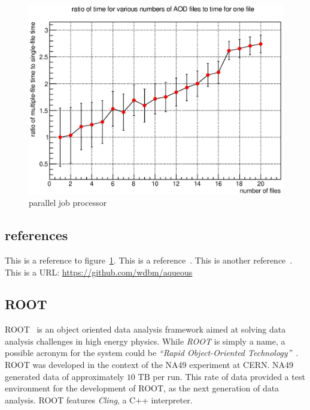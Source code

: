 \begin{figure}[H]
\begin{center}
\includegraphics[width=\textwidth]{images/2014-04-10_2.eps}
\end{center}
\caption{parallel job processor}
\label{figure:PJP_1}
\end{figure}

\subsection{references}

This is a reference to figure~\ref{figure:PJP_1}. This is a reference~\cite{Tianjun_1}. This is another reference~\cite{McCulloch_Pitts_1}. This is a URL: \href{https://github.com/wdbm/aqueous}{\textcolor{black!100}{https://github.com/wdbm/aqueous}}


\subsection{ROOT}

ROOT~\cite{ROOT} is an object oriented data analysis framework aimed at solving data analysis challenges in high energy physics. While \emph{ROOT} is simply a name, a possible acronym for the system could be \emph{``Rapid Object-Oriented Technology''}~\cite{ROOT_acronym}. ROOT was developed in the context of the NA49 experiment at CERN. NA49 generated data of approximately ${10\textrm{ TB}}$ per run. This rate of data provided a test environment for the development of ROOT, as the next generation of data analysis. ROOT features \emph{Cling}, a C++ interpreter.

